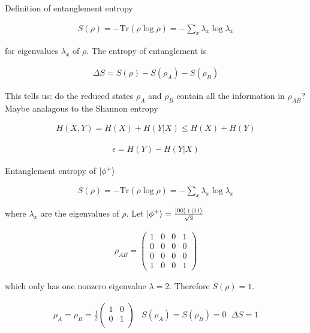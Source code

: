 \documentclass[aspectratio=1610]{beamer}					%
\begin{document}
\begin{frame}{Definition of entanglement entropy}

\begin{align*}
S(\rho) = -\mathrm{Tr}(\rho\log\rho) = -\sum_{x}\lambda_{x}\log\lambda_{x}
\end{align*}

for eigenvalues $\lambda_{x}$ of $\rho$. The entropy of entanglement is

\begin{align*}
\Delta S = S(\rho) - S(\rho_{A}) - S(\rho_{B})
\end{align*}

This tells us: do the reduced states $\rho_{A}$ and $\rho_{B}$ contain all the information in $\rho_{AB}$? Maybe analagous to the Shannon entropy

\begin{align*}
H(X,Y) = H(X) + H(Y|X) \leq H(X) + H(Y)
\end{align*}

\begin{align*}
\epsilon = H(Y) - H(Y|X)
\end{align*}

\end{frame}

\begin{frame}{Entanglement entropy of $\ket{\phi^{+}}$}

\begin{align*}
S(\rho) = -\mathrm{Tr}(\rho\log\rho) = -\sum_{x}\lambda_{x}\log\lambda_{x}
\end{align*}

where $\lambda_{x}$ are the eigenvalues of $\rho$. Let $\ket{\phi^{+}} = \frac{\ket{00} + \ket{11}}{\sqrt{2}}$

\begin{align*}
\rho_{AB} = 
\begin{pmatrix}
1 & 0 & 0 & 1 \\
0 & 0 & 0 & 0 \\
0 & 0 & 0 & 0 \\
1 & 0 & 0 & 1
\end{pmatrix}
\end{align*}

which only has one nonzero eigenvalue $\lambda = 2$. Therefore $S(\rho) = 1$.

\begin{align*}
\rho_{A} = \rho_{B} = \frac{1}{2}\begin{pmatrix}
1 & 0\\
0 & 1\\
\end{pmatrix}
\;\;\; S(\rho_{A}) = S(\rho_{B}) = 0  \;\; \Delta S = 1
\end{align*}

\end{frame}
\end{document}
